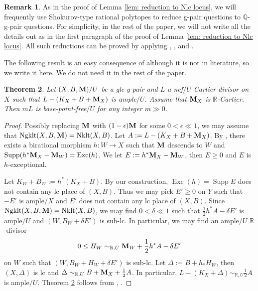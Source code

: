 \documentclass[11pt]{amsart}
\numberwithin{equation}{section}
\newcommand{\Mm}{{\bf{M}}}
\newcommand{\Rr}{\mathbb{R}}
\newcommand{\Exc}{\operatorname{Exc}}
\newcommand{\Nklt}{\operatorname{Nklt}}
\newcommand{\Supp}{\operatorname{Supp}}
\newcommand{\Ngklt}{\operatorname{Ngklt}}
\newtheorem{thm}{Theorem}[section]
\theoremstyle{definition}
\theoremstyle{definition}
\newtheorem{rem}[thm]{Remark}
\theoremstyle{definition}
\begin{document}
\begin{rem}\label{rem: to q coefficients}
As in the proof of Lemma \ref{lem: reduction to Nlc locus}, we will frequently use Shokurov-type rational polytopes to reduce g-pair questions to $\mathbb Q$-g-pair questions. For simplicity, in the rest of the paper, we will not write all the details out as in the first paragraph of the proof of Lemma \ref{lem: reduction to Nlc locus}. All such reductions can be proved by applying \cite[Proposition 3.16]{HL22}, \cite[Lemma 5.3]{HLS19}, and \cite[Theorem 1.4]{Che20}.
\end{rem}


The following result is an easy consequence of \cite[Lemma 5.18]{HL21a} although it is not in literature, so we write it here. We do not need it in the rest of the paper.

\begin{thm}\label{thm: bpf with mx r cartier}
Let $(X,B,\Mm)/U$ be a glc g-pair and $L$ a nef$/U$ Cartier divisor on $X$ such that $L-(K_X+B+\Mm_X)$ is ample$/U$. Assume that $\Mm_X$ is $\mathbb R$-Cartier. Then $mL$ is base-point-free$/U$ for any integer $m\gg 0$.
\end{thm}
\begin{proof}
Possibly replacing $\Mm$ with $(1-\epsilon)\Mm$ for some $0<\epsilon\ll 1$, we may assume that $\Ngklt(X,B,\Mm)=\Nklt(X,B)$. Let $A:=L-(K_X+B+\Mm_X)$. By \cite[Lemma 5.18]{HL21a}, there exists a birational morphism $h: W\rightarrow X$ such that $\Mm$ descends to $W$ and $\Supp(h^*\Mm_X-\Mm_W)=\Exc(h)$. We let $E:=h^*\Mm_X-\Mm_W$, then $E\geq 0$ and $E$ is $h$-exceptional.

Let $K_W+B_W:=h^*(K_X+B)$. By our construction, $\Exc(h)= \Supp E$ does not contain any lc place of $(X,B)$. Thus we may pick $E'\geq 0$ on $Y$ such that $-E'$ is ample$/X$ and $E'$ does not contain any lc place of $(X,B)$. Since $\Ngklt(X,B,\Mm)=\Nklt(X,B)$, we may find $0<\delta\ll 1$ such that $\frac{1}{2}h^*A-\delta E'$ is ample$/U$ and $(W,B_W+\delta E')$ is sub-lc. In particular, we may find an ample$/U$ $\Rr$-divisor $$0\leq H_W\sim_{\Rr,U}\Mm_W+\frac{1}{2}h^*A-\delta E'$$ on $W$ such that $(W,B_W+H_W+\delta E')$ is sub-lc. Let $\Delta:=B+h_*H_W$, then $(X,\Delta)$ is lc and $\Delta\sim_{\Rr,U}B+\Mm_X+\frac{1}{2}A$. In particular, $L-(K_X+\Delta)\sim_{\mathbb R,U}\frac{1}{2}A$ is ample$/U$. Theorem \ref{thm: bpf with mx r cartier} follows from \cite[Theorem 5.3]{Amb03}, \cite[Theorems 4.5.5, 6.5.1]{Fuj17}.
\end{proof}
\end{document}
